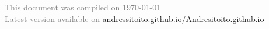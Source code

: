 \documentclass{resume} %
\begin{document}






\begin{flushright}
\end{flushright} 
\textcolor{gray}{This document was compiled on \today\\ Latest version available on \href{https://andressitoito.github.io/Andresitoito.github.io/index.pdf}{andressitoito.github.io/Andresitoito.github.io}}
\end{document}
